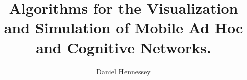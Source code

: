 \documentclass[12pt, letterpaper]{drexelthesis}
\author{Daniel Hennessey}
\title{Algorithms for the Visualization and Simulation of Mobile Ad Hoc and Cognitive Networks.}
\begin{document}
 

	\doublespacing
	\maketitle 

\begin{preliminary}
	\sloppy
	\copyrightpage
%	
	
	\mytableofcontents
	\mylistoftables
	\mylistoffigures
	
\end{preliminary}

\begin{thesis}
	\fussy

	\singlespacing
%	
	
	
\end{thesis}
\end{document}
